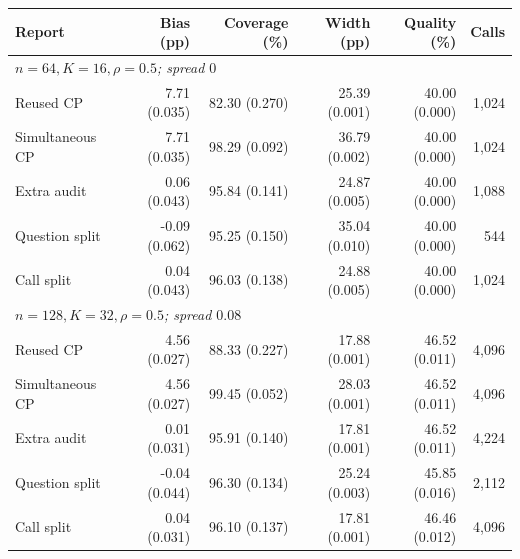 \begin{tabular}{lrrrrr}
\toprule
Report & Bias (pp) & Coverage (\%) & Width (pp) & Quality (\%) & Calls \\
\midrule
\multicolumn{6}{l}{\textit{$n=64, K=16, \rho=0.5$; spread $0$}} \\
Reused CP & 7.71 (0.035) & 82.30 (0.270) & 25.39 (0.001) & 40.00 (0.000) & 1,024 \\
Simultaneous CP & 7.71 (0.035) & 98.29 (0.092) & 36.79 (0.002) & 40.00 (0.000) & 1,024 \\
Extra audit & 0.06 (0.043) & 95.84 (0.141) & 24.87 (0.005) & 40.00 (0.000) & 1,088 \\
Question split & -0.09 (0.062) & 95.25 (0.150) & 35.04 (0.010) & 40.00 (0.000) & 544 \\
Call split & 0.04 (0.043) & 96.03 (0.138) & 24.88 (0.005) & 40.00 (0.000) & 1,024 \\
\midrule
\multicolumn{6}{l}{\textit{$n=128, K=32, \rho=0.5$; spread $0.08$}} \\
Reused CP & 4.56 (0.027) & 88.33 (0.227) & 17.88 (0.001) & 46.52 (0.011) & 4,096 \\
Simultaneous CP & 4.56 (0.027) & 99.45 (0.052) & 28.03 (0.001) & 46.52 (0.011) & 4,096 \\
Extra audit & 0.01 (0.031) & 95.91 (0.140) & 17.81 (0.001) & 46.52 (0.011) & 4,224 \\
Question split & -0.04 (0.044) & 96.30 (0.134) & 25.24 (0.003) & 45.85 (0.016) & 2,112 \\
Call split & 0.04 (0.031) & 96.10 (0.137) & 17.81 (0.001) & 46.46 (0.012) & 4,096 \\
\bottomrule
\end{tabular}
